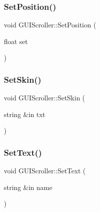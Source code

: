 \hypertarget{class_g_u_i_scroller_ad7215df95da44cc0c889016a3a199724}{}\label{class_g_u_i_scroller_ad7215df95da44cc0c889016a3a199724} 
\subsubsection{\texorpdfstring{Set\+Position()}{SetPosition()}}
{\footnotesize\ttfamily void G\+U\+I\+Scroller\+::\+Set\+Position (\begin{DoxyParamCaption}\item[{float}]{set }\end{DoxyParamCaption})}

\hypertarget{class_g_u_i_scroller_a64489d631fb6a8cfb76b3f64d3a38b13}{}\label{class_g_u_i_scroller_a64489d631fb6a8cfb76b3f64d3a38b13} 
\subsubsection{\texorpdfstring{Set\+Skin()}{SetSkin()}}
{\footnotesize\ttfamily void G\+U\+I\+Scroller\+::\+Set\+Skin (\begin{DoxyParamCaption}\item[{string \&in}]{txt }\end{DoxyParamCaption})}

\hypertarget{class_g_u_i_scroller_aa420514e8de086c05710bad0af31b07c}{}\label{class_g_u_i_scroller_aa420514e8de086c05710bad0af31b07c} 
\subsubsection{\texorpdfstring{Set\+Text()}{SetText()}}
{\footnotesize\ttfamily void G\+U\+I\+Scroller\+::\+Set\+Text (\begin{DoxyParamCaption}\item[{string \&in}]{name }\end{DoxyParamCaption})}

\hypertarget{class_g_u_i_scroller_adff9bfd02390c6fd5aa07956a6146bf8}{}\label{class_g_u_i_scroller_adff9bfd02390c6fd5aa07956a6146bf8} 
